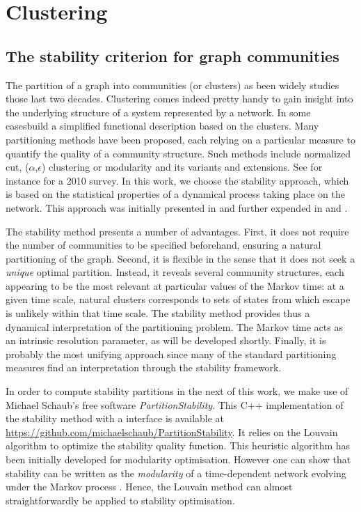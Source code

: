 \chapter{Clustering}
\section{The stability criterion for graph communities} \label{sec:stability}
The partition of a graph into communities (or clusters) as been widely studies those last two decades. Clustering comes indeed pretty handy to gain insight into the underlying structure of a system represented by a network. In some casesbuild a simplified functional description based on the clusters. Many partitioning methods have been proposed, each relying on a particular measure to quantify the quality of a community structure. Such methods include normalized cut, ($\alpha$,$\epsilon$) clustering or modularity and its variants and extensions. See for instance \cite{fortunato2010community} for a 2010 survey. In this work, we choose the stability approach, which is based on the statistical properties of a dynamical process taking place on the network. This approach was initially presented in \cite{delvenne2010stability} and further expended in \cite{lambiotte2009laplacian} and \cite{delvenne2013stability}. 

The stability method presents a number of advantages. First, it does not require the number of communities to be specified beforehand, ensuring a natural partitioning of the graph. Second, it is flexible in the sense that it does not seek a \textit{unique} optimal partition. Instead, it reveals several community structures, each appearing to be the most relevant at particular values of the Markov time: at a given time scale, natural clusters corresponds to sets of states from which escape is unlikely within that time scale. The stability method provides thus a dynamical interpretation of the partitioning problem. The Markov time acts as an intrinsic resolution parameter, as will be developed shortly. Finally, it is probably the most unifying approach since many of the standard partitioning measures find an interpretation through the stability framework.

In order to compute stability partitions in the next of this work, we make use of Michael Schaub's free software \textit{PartitionStability}. This C++ implementation of the stability method with a \matlab interface is available at \url{https://github.com/michaelschaub/PartitionStability}. It relies on the Louvain algorithm \cite{blondel2008fast} to optimize the stability quality function. This heuristic algorithm has been initially developed for modularity optimisation. However one can show that stability can be written as the \textit{modularity} of a time-dependent network evolving under the Markov process \cite{lambiotte2009laplacian}. Hence, the Louvain method can almost straightforwardly be applied to stability optimisation.

